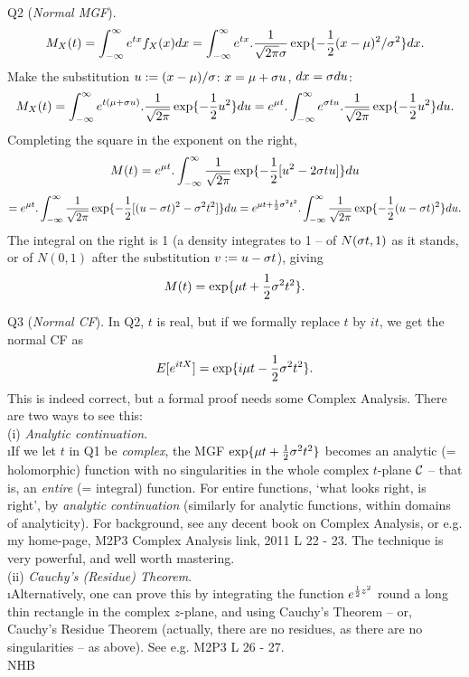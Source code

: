 \documentclass[12pt]{article}
\begin{document}
\ni Q2 ({\it Normal MGF}).
$$
M_X(t) = \int_{-\infty}^{\infty} e^{tx} f_X(x) dx = \int_{-\infty}^{\infty} e^{tx}.\frac{1}{\sqrt{2 \pi} \sigma} \exp \{-\frac{1}{2}(x - \mu)^2/{\sigma}^2 \} dx.
$$
Make the substitution $u := (x - \mu)/\sigma$: $x = \mu + \sigma u$, $dx = \sigma du$:
$$
M_X(t) = \int_{-\infty}^{\infty} e^{t(\mu + \sigma u)}.\frac{1}{\sqrt{2 \pi}} \exp \{-\frac{1}{2}u^2 \} du
= e^{\mu t}.\int_{-\infty}^{\infty} e^{\sigma t u}.\frac{1}{\sqrt{2 \pi}} \exp \{-\frac{1}{2}u^2 \} du.
$$
Completing the square in the exponent on the right,
$$
M(t)
= e^{\mu t}.\int_{-\infty}^{\infty} \frac{1}{\sqrt{2 \pi}} \exp \{-\frac{1}{2}[u^2 - 2\sigma t u] \} du
$$
$$
= e^{\mu t}.\int_{-\infty}^{\infty} \frac{1}{\sqrt{2 \pi}} \exp \{-\frac{1}{2}[(u - \sigma t)^2 - {\sigma}^2 t^2] \} du
= e^{\mu t + \frac{1}{2}{\sigma}^2 t^2}.\int_{-\infty}^{\infty} \frac{1}{\sqrt{2 \pi}} \exp \{-\frac{1}{2}(u - \sigma t)^2 \} du.
$$
The integral on the right is 1 (a density integrates to 1 -- of $N(\sigma t,1)$ as it stands, or of $N(0,1)$ after the substitution $v := u - \sigma t$), giving
$$
M(t) = \exp \{ \mu t + \frac{1}{2}{\sigma}^2 t^2 \}.
$$

\ni Q3 ({\it Normal CF}).  In Q2, $t$ is real, but if we formally replace $t$ by $it$, we get the normal CF as
$$
E[e^{itX}] = \exp \{ i \mu t - \frac{1}{2}{\sigma}^2 t^2 \}.
$$
This is indeed correct, but a formal proof needs some Complex Analysis.  There are two ways to see this: \\
(i) {\it Analytic continuation}.  \\
\i If we let $t$ in Q1 be {\it complex}, the MGF $\exp \{ \mu t + \frac{1}{2}{\sigma}^2 t^2 \}$ becomes an analytic (= holomorphic) function with no singularities in the whole complex $t$-plane $\cal C$ -- that is, an {\it entire} (= integral) function.  For entire functions, `what looks right, is right', by {\it analytic continuation} (similarly for analytic functions, within domains of analyticity).  For background, see any decent book on Complex Analysis, or e.g. my home-page, M2P3 Complex Analysis link, 2011 L 22 - 23.  The technique is very powerful, and well worth mastering. \\
(ii) {\it Cauchy's (Residue) Theorem}. \\
\i  Alternatively, one can prove this by integrating the function $e^{\frac{1}{2} z^2}$ round a long thin rectangle in the complex $z$-plane, and using Cauchy's Theorem -- or, Cauchy's Residue Theorem (actually, there are no residues, as there are no singularities -- as above).  See e.g. M2P3 L 26 - 27. \\

\hfil NHB \break
\end{document}
